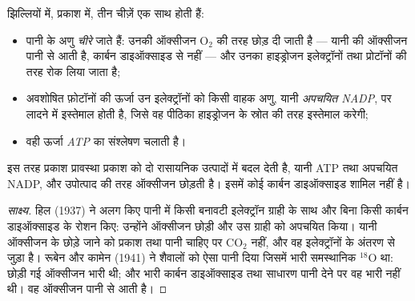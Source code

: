 \begin{proposition}[थाइलेकॉइडों में क्या होता है]\label{prop:g12:photosynthesis:lightphase}
 झिल्लियों में, प्रकाश में, तीन चीज़ें एक साथ होती हैं:
\begin{itemize}
  \item पानी के अणु \emph{चीरे} जाते हैं: उनकी ऑक्सीजन $\mathrm{O_2}$ की
        तरह छोड़ दी जाती है --- यानी  की ऑक्सीजन पानी से आती
        है, कार्बन डाइऑक्साइड से नहीं --- और उनका हाइड्रोजन इलेक्ट्रॉनों
        तथा प्रोटॉनों की तरह रोक लिया जाता है;
  \item अवशोषित फ़ोटॉनों की ऊर्जा उन इलेक्ट्रॉनों को किसी वाहक अणु, यानी
        \emph{अपचयित NADP}, पर लादने में इस्तेमाल होती है, जिसे वह पीठिका
        हाइड्रोजन के स्रोत की तरह इस्तेमाल करेगी;
  \item वही ऊर्जा \emph{ATP} का संश्लेषण चलाती है।
\end{itemize}
इस तरह प्रकाश प्रावस्था प्रकाश को दो रासायनिक उत्पादों में बदल देती है, यानी
ATP तथा अपचयित NADP, और उपोत्पाद की तरह ऑक्सीजन छोड़ती है। इसमें कोई कार्बन
डाइऑक्साइड शामिल नहीं है।
\end{proposition}
\begin{proof}[साक्ष्य]
हिल (1937) ने अलग किए  पानी में किसी बनावटी इलेक्ट्रॉन ग्राही के साथ
और बिना किसी कार्बन डाइऑक्साइड के रोशन किए: उन्होंने ऑक्सीजन छोड़ी और उस
ग्राही को अपचयित किया। यानी ऑक्सीजन के छोड़े जाने को प्रकाश तथा पानी चाहिए
पर $\mathrm{CO_2}$ नहीं, और वह इलेक्ट्रॉनों के अंतरण से जुड़ा है। रूबेन और
कामेन (1941) ने शैवालों को ऐसा पानी दिया जिसमें भारी समस्थानिक $^{18}$O था:
छोड़ी गई ऑक्सीजन भारी थी; और भारी कार्बन डाइऑक्साइड तथा साधारण पानी देने
पर वह भारी नहीं थी। वह ऑक्सीजन पानी से आती है।
\end{proof}

